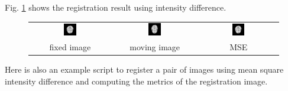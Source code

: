 Fig. \ref{fig:metric_example} shows the registration result using intensity difference.
\begin{figure}
    \label{fig:metric_example}
    \centering
    \begin{tabular}[h]{c|c|c}
        \includegraphics[width=0.16\textwidth]{Figures/r16slice.jpg} &
        \includegraphics[width=0.16\textwidth]{Figures/r64slice.jpg} &
        \includegraphics[width=0.16\textwidth]{Figures/resMSQ.jpg} \\
        fixed image &
        moving image & 
        MSE  \\
    \end{tabular} 
\end{figure}
Here is also an example script to register a pair of images using mean
square intensity difference and computing the metrics of the
registration image.
